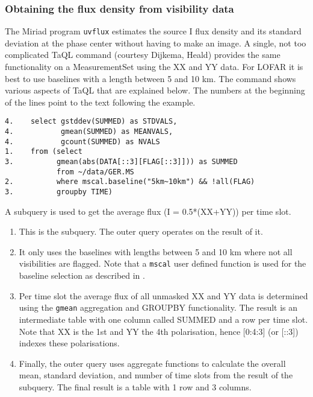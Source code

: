 \subsubsection{Obtaining the flux density from visibility data}
The Miriad program \texttt{uvflux} estimates the source I flux density and its standard deviation at the phase center without having to make an image. 
A single, not too complicated TaQL command (courtesy Dijkema, Heald)
provides the same functionality on a MeasurementSet using the XX and YY data.
For LOFAR it is best to use baselines with a length between 5 and 10 km.
The command shows various aspects of TaQL that are explained below. 
The numbers at the beginning of the lines point to the text following
the example. 
\begin{verbatim}
4.    select gstddev(SUMMED) as STDVALS,
4.           gmean(SUMMED) as MEANVALS,
4.           gcount(SUMMED) as NVALS
1.    from (select 
3.          gmean(abs(DATA[::3][FLAG[::3]])) as SUMMED
            from ~/data/GER.MS
2.          where mscal.baseline("5km~10km") && !all(FLAG)
3.          groupby TIME)
\end{verbatim}
A subquery is used to get the average flux (I = 0.5*(XX+YY)) per time slot.
\begin{enumerate}
\item This is the subquery. The outer query operates on the result of it.
\item It only uses the baselines with lengths between 5 and 10 km
  where not all visibilities are flagged. Note that a \texttt{mscal}
  user defined function is used for the baseline selection as described
  in .
\item Per time slot the average flux of all unmasked XX and YY data is determined
  using the \texttt{gmean} aggregation and GROUPBY functionality. The
  result is an intermediate table with one column called SUMMED and a row per time slot. 
  Note that XX is the 1st and YY the 4th
  polarisation, hence [0:4:3] (or [::3]) indexes these polarisations. 
\item Finally, the outer query uses aggregate functions to calculate
  the overall mean, standard deviation, and number of time slots from
  the result of the subquery. The
  final result is a table with 1 row and 3 columns. 
\end{enumerate}

